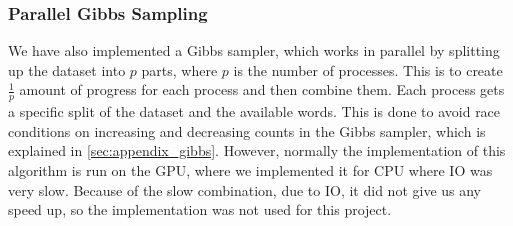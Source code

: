 \subsubsection*{Parallel Gibbs Sampling}\label{sec:appendix_para_gibbs}
We have also implemented a Gibbs sampler, which works in parallel by splitting up the dataset into $p$ parts, where $p$ is the number of processes.
This is to create $\frac{1}{p}$ amount of progress for each process and then combine them.
Each process gets a specific split of the dataset and the available words. 
This is done to avoid race conditions on increasing and decreasing counts in the Gibbs sampler, which is explained in \autoref{sec:appendix_gibbs}.
However, normally the implementation of this algorithm is run on the GPU, where we implemented it for CPU where IO was very slow.
Because of the slow combination, due to IO, it did not give us any speed up, so the implementation was not used for this project. 
